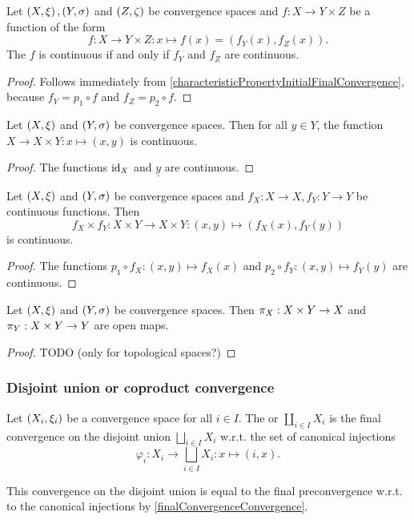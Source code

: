 \begin{lemma} \label{continuityFunctionTuple}
Let $\left( X,\xi \right), \left( Y,\sigma \right)$ and $\left( Z,\zeta \right)$ be convergence spaces and $f: X\to Y\times Z$ be a function of the form
\[ f: X\to Y\times Z: x\mapsto f(x) = (f_Y(x), f_Z(x)). \]
The $f$ is continuous \textup{if and only if} $f_Y$ and $f_Z$ are continuous.
\end{lemma}
\begin{proof}
Follows immediately from \ref{characteristicPropertyInitialFinalConvergence},
because $f_Y = p_1\circ f$ and $f_Z = p_2\circ f$.
\end{proof}
\begin{corollary} \label{continuousEmbeddingProduct}
Let $\left( X,\xi \right)$ and $\left( Y,\sigma \right)$ be convergence spaces. Then for all $y\in Y$, the function $X\to X\times Y: x\mapsto (x,y)$ is continuous.
\end{corollary}
\begin{proof}
The functions $\operatorname{id}_X$ and $\underline{y}$ are continuous.
\end{proof}
\begin{corollary} \label{productContinuousFunctions}
Let $\left( X,\xi \right)$ and $\left( Y,\sigma \right)$ be convergence spaces and $f_X: X\to X, f_Y: Y\to Y$ be continuous functions. Then
\[ f_X\times f_Y: X\times Y \to X\times Y: (x,y)\mapsto (f_X(x), f_Y(y))  \]
is continuous.
\end{corollary}
\begin{proof}
The functions $p_1\circ f_X: (x,y) \mapsto f_X(x)$ and $p_2\circ f_Y: (x,y) \mapsto f_Y(y)$ are continuous.
\end{proof}

\begin{proposition}
Let $\left( X,\xi \right)$ and $\left( Y,\sigma \right)$ be convergence spaces. Then $\pi_X: X\times Y\to X$ and $\pi_Y: X\times Y\to Y$ are open maps.
\end{proposition}
\begin{proof}
TODO (only for topological spaces?)
\end{proof}

\subsubsection{Disjoint union or coproduct convergence}
\begin{definition}
Let $\left( X_i, \xi_i \right)$ be a convergence space for all $i\in I$. The  or  $\coprod_{i\in I}X_i$ is the final convergence on the disjoint union $\bigsqcup_{i\in I}X_i$ w.r.t. the set of canonical injections
\[ \varphi_i: X_i \to \bigsqcup_{i\in I}X_i: x\mapsto (i, x). \]
\end{definition}
This convergence on the disjoint union is equal to the final preconvergence w.r.t. to the canonical injections by \ref{finalConvergenceConvergence}.

